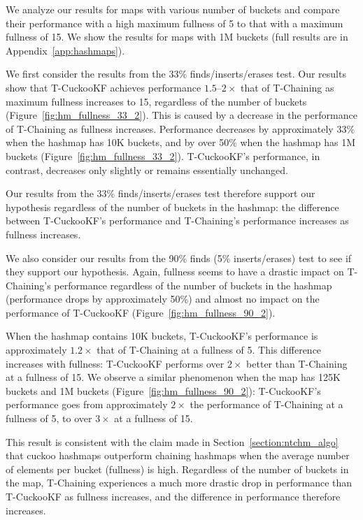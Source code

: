 We analyze our results for maps with various number of buckets and compare their performance with a high maximum fullness of 5 to that with a maximum fullness of 15. We show the results for maps with 1M buckets (full results are in Appendix~\ref{app:hashmaps}).

We first consider the results from the 33\% finds/inserts/erases test. Our results show that T-CuckooKF achieves performance $1.5$--$2\times$ that of T-Chaining as maximum fullness increases to 15, regardless of the number of buckets (Figure~\ref{fig:hm_fullness_33_2}). 
This is caused by a decrease in the performance of T-Chaining as fullness increases. Performance decreases by approximately 33\% when the hashmap has 10K buckets, and by over 50\% when the hashmap has 1M buckets (Figure~\ref{fig:hm_fullness_33_2}). T-CuckooKF's performance, in contrast, decreases only slightly or remains essentially unchanged.

Our results from the 33\% finds/inserts/erases test therefore support our hypothesis regardless of the number of buckets in the hashmap: the difference between T-CuckooKF's performance and T-Chaining's performance increases as fullness increases. 

We also consider our results from the 90\% finds (5\% inserts/erases) test to see if they support our hypothesis.
Again, fullness seems to have a drastic impact on T-Chaining's performance regardless of the number of buckets in the hashmap (performance drops by approximately 50\%) and almost no impact on the performance of T-CuckooKF (Figure~\ref{fig:hm_fullness_90_2}). 

When the hashmap contains 10K buckets, T-CuckooKF's performance is approximately $1.2\times$ that of T-Chaining at a fullness of 5. This difference increases with fullness: T-CuckooKF performs over $2\times$ better than T-Chaining at a fullness of 15.
We observe a similar phenomenon when the map has 125K buckets and 1M buckets (Figure~\ref{fig:hm_fullness_90_2}): T-CuckooKF's performance goes from approximately $2\times$ the performance of T-Chaining at a fullness of 5, to over $3\times$ at a fullness of 15.
 
This result is consistent with the claim made in Section~\ref{section:ntchm_algo} that cuckoo hashmaps outperform chaining hashmaps when the average number of elements per bucket (fullness) is high.
Regardless of the number of buckets in the map, T-Chaining experiences a much more drastic drop in performance than T-CuckooKF as fullness increases, and the difference in performance therefore increases.

